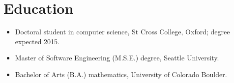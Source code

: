 \section*{Education}
\vspace{-2mm}

\begin{itemize}
    \item Doctoral student in computer science, St Cross College, Oxford;
        degree expected 2015.\vspace{-1mm}
	\item Master of Software Engineering (M.S.E.) degree, Seattle University.\vspace{-1mm}
	\item Bachelor of Arts (B.A.) mathematics, University of Colorado Boulder.
\end{itemize}

